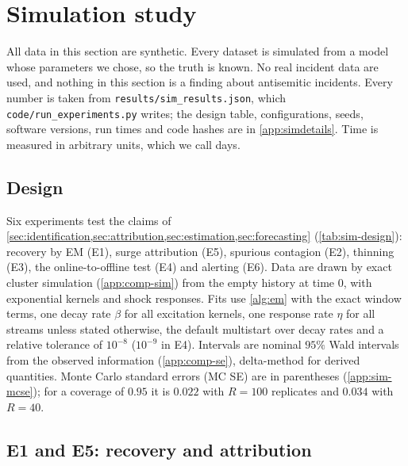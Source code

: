 \section{Simulation study}\label{sec:simulation}

All data in this section are synthetic. Every dataset is simulated from a model whose
parameters we chose, so the truth is known. No real incident data are used, and nothing in
this section is a finding about antisemitic incidents. Every number is taken from
\texttt{results/sim\_results.json}, which \texttt{code/run\_experiments.py} writes; the
design table, configurations, seeds, software versions, run times and code hashes are in
\cref{app:simdetails}. Time is measured in arbitrary units, which we call days.

\subsection{Design}\label{sec:sim-design}

Six experiments test the claims of
\cref{sec:identification,sec:attribution,sec:estimation,sec:forecasting}
(\cref{tab:sim-design}): recovery by EM (E1), surge attribution (E5), spurious contagion
(E2), thinning (E3), the online-to-offline test (E4) and alerting (E6). Data are drawn by
exact cluster simulation (\cref{app:comp-sim}) from the empty history at time $0$, with
exponential kernels and shock responses. Fits use \cref{alg:em} with the exact window
terms, one decay rate $\beta$ for all excitation kernels, one response rate $\eta$ for all
streams unless stated otherwise, the default multistart over decay rates and a relative
tolerance of $10^{-8}$ ($10^{-9}$ in E4). Intervals are nominal $95\%$ Wald intervals from the
observed information (\cref{app:comp-se}), delta-method for derived quantities. Monte Carlo
standard errors (MC SE) are in parentheses (\cref{app:sim-mcse}); for a coverage of $0.95$
it is $0.022$ with $R=100$ replicates and $0.034$ with $R=40$.

\subsection{E1 and E5: recovery and attribution}\label{sec:sim-recovery}\label{sec:sim-attribution}

